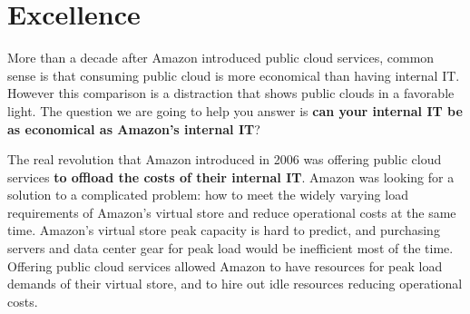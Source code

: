 \renewcommand{\thetable}{\thesection\alph{table}}

\chapter{Excellence}
\label{cha:excellence}

%
%

More than a decade after Amazon introduced public cloud services, common sense
is that consuming public cloud is more economical than having internal IT.
However this comparison is a distraction that shows public clouds in a favorable
light. The question we are going to help you answer is \textbf{can your internal
IT be as economical as Amazon's internal IT}?

The real revolution that Amazon introduced in 2006 was offering public cloud
services \textbf{to offload the costs of their internal IT}. Amazon was looking
for a solution to a complicated problem: how to meet the widely varying load
requirements of Amazon's virtual store and reduce operational costs at the same
time. Amazon's virtual store peak capacity is hard to predict, and purchasing
servers and data center gear for peak load would be inefficient most of the
time. Offering public cloud services allowed Amazon to have resources for peak
load demands of their virtual store, and to hire out idle resources reducing
operational costs.

